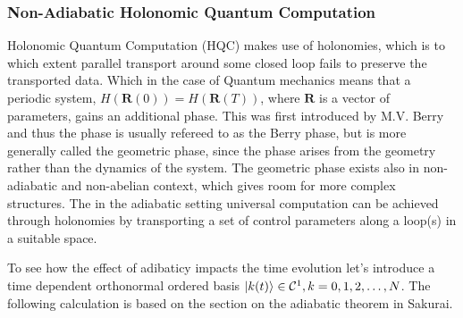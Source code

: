 \subsubsection{Non-Adiabatic Holonomic Quantum Computation}
Holonomic Quantum Computation (HQC) makes use of holonomies, which is to which extent parallel transport around some closed loop fails to preserve the transported data. Which in the case of Quantum mechanics means that a periodic system, $H(\mathbf{R}(0)) = H(\mathbf{R}(T))$, where $\mathbf{R}$ is a vector of parameters, gains an additional phase. This was first introduced by M.V. Berry\cite{berry} and thus the phase is usually refereed to as the Berry phase, but is more generally called the geometric phase, since the phase arises from the geometry rather than the dynamics of the system. The geometric phase exists also in non-adiabatic and non-abelian context, which gives room for more complex structures\cite{anandan1,anandan2,zee}. 
The in the adiabatic setting universal computation can be achieved through holonomies by transporting a set of control parameters along a loop(s) in a suitable space\cite{HQC}.

To see how the effect of adibaticy impacts the time evolution let's introduce a time dependent orthonormal ordered basis $\ket{k(t)} \in \mathcal{C}^1, k = 0,1,2,\dots,N$. The following calculation is based on the section on the adiabatic theorem in Sakurai\cite{Sakurai}.


